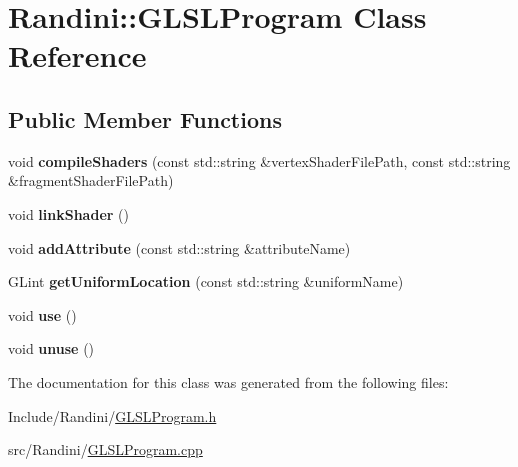 \hypertarget{classRandini_1_1GLSLProgram}{
\section{Randini::GLSLProgram Class Reference}
\label{classRandini_1_1GLSLProgram}
}
\subsection*{Public Member Functions}
\begin{DoxyCompactItemize}
\item 
\hypertarget{classRandini_1_1GLSLProgram_a73328c415caa63862b713bb840b85532}{
void {\bfseries compileShaders} (const std::string \&vertexShaderFilePath, const std::string \&fragmentShaderFilePath)}
\label{classRandini_1_1GLSLProgram_a73328c415caa63862b713bb840b85532}

\item 
\hypertarget{classRandini_1_1GLSLProgram_aa67b3edb1c8eae84dc65d5e913e144cd}{
void {\bfseries linkShader} ()}
\label{classRandini_1_1GLSLProgram_aa67b3edb1c8eae84dc65d5e913e144cd}

\item 
\hypertarget{classRandini_1_1GLSLProgram_ad623f8c42dfa974c7820949905a53d18}{
void {\bfseries addAttribute} (const std::string \&attributeName)}
\label{classRandini_1_1GLSLProgram_ad623f8c42dfa974c7820949905a53d18}

\item 
\hypertarget{classRandini_1_1GLSLProgram_a8ed1430de4e2629d6dcddf8eafd6ce09}{
GLint {\bfseries getUniformLocation} (const std::string \&uniformName)}
\label{classRandini_1_1GLSLProgram_a8ed1430de4e2629d6dcddf8eafd6ce09}

\item 
\hypertarget{classRandini_1_1GLSLProgram_a7371ee6e41ba0d03a61663d67551da48}{
void {\bfseries use} ()}
\label{classRandini_1_1GLSLProgram_a7371ee6e41ba0d03a61663d67551da48}

\item 
\hypertarget{classRandini_1_1GLSLProgram_a29fb698f73e40621ec181ed7c3c3e7be}{
void {\bfseries unuse} ()}
\label{classRandini_1_1GLSLProgram_a29fb698f73e40621ec181ed7c3c3e7be}

\end{DoxyCompactItemize}


The documentation for this class was generated from the following files:\begin{DoxyCompactItemize}
\item 
Include/Randini/\hyperlink{GLSLProgram_8h}{GLSLProgram.h}\item 
src/Randini/\hyperlink{GLSLProgram_8cpp}{GLSLProgram.cpp}\end{DoxyCompactItemize}
